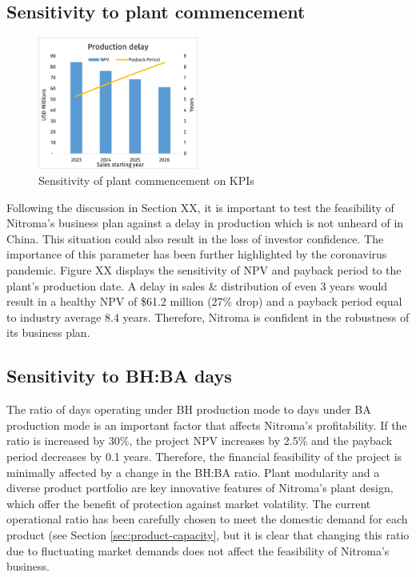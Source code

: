 \subsection{Sensitivity to plant commencement}
\begin{figure}
    \caption{Sensitivity of plant commencement on KPIs}
    \label{Sensitivity_ProductionDelay}
    \includegraphics[width=0.47\textwidth]{chapters/6-economics/figures/Sensitivity_ProductionDelay.jpg}
\end{figure}
Following the discussion in Section XX, it is important to test the feasibility of Nitroma’s business plan against a delay in production which is not unheard of in China.  This situation could also result in the loss of investor confidence. The importance of this parameter has been further highlighted by the coronavirus pandemic. Figure XX displays the sensitivity of NPV and payback period to the plant’s production date. A delay in sales \& distribution of even 3 years would result in a healthy NPV of \$61.2 million (27\% drop) and a payback period equal to industry average 8.4 years. Therefore, Nitroma is confident in the robustness of its business plan.

\subsection{Sensitivity to BH:BA days}
The ratio of days operating under BH production mode to days under BA production mode is an important factor that affects Nitroma’s profitability. If the ratio is increased by 30\%, the project NPV increases by 2.5\% and the payback period decreases by 0.1 years. Therefore, the financial feasibility of the project is minimally affected by a change in the BH:BA ratio. Plant modularity and a diverse product portfolio are key innovative features of Nitroma’s plant design, which offer the benefit of protection against market volatility. The current operational ratio has been carefully chosen to meet the domestic demand for each product (see Section \ref{sec:product-capacity}, but it is clear that changing this ratio due to fluctuating market demands does not affect the feasibility of Nitroma’s business.
